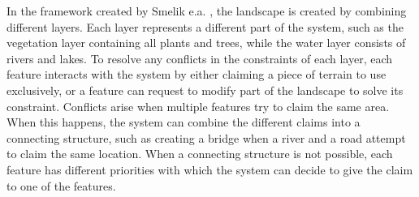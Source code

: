 \documentclass{article}
\begin{document}
In the framework created by Smelik e.a. \cite{smelik_declarative_2011}, the landscape is created by combining different layers. Each layer represents a different part of the system, such as the vegetation layer containing all plants and trees, while the water layer consists of rivers and lakes. To resolve any conflicts in the constraints of each layer, each feature interacts with the system by either claiming a piece of terrain to use exclusively, or a feature can request to modify part of the landscape to solve its constraint. Conflicts arise when multiple features try to claim the same area. When this happens, the system can combine the different claims into a connecting structure, such as creating a bridge when a river and a road attempt to claim the same location. When a connecting structure is not possible, each feature has different priorities with which the system can decide to give the claim to one of the features.\


\end{document}
